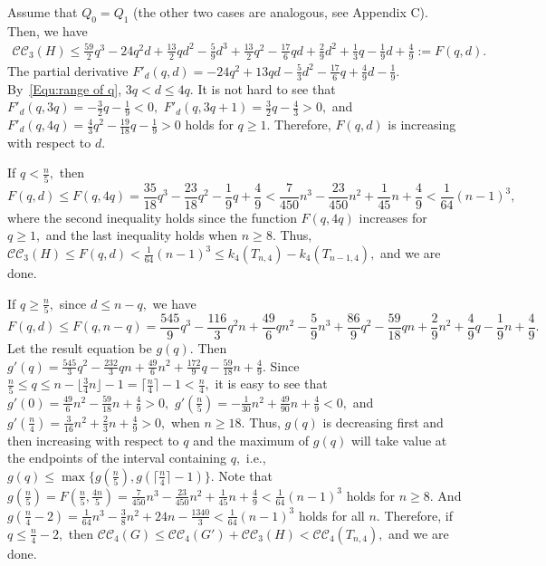 \documentclass[11pt,a4paper]{article}
\newcommand{\turangraph}[2]{T_{#1,#2}}
\newcommand{\coveropt}[2]{{\mathcal{C}\mathcal{C}_{#1}(#2)}}
\begin{document}
Assume that $Q_0=Q_1$ (the other two cases are analogous, see Appendix C).
Then, we have
\begin{align}\label{Equ:CC3(H)<F(q,d)}
    \coveropt{3}{H} \leq	
    \frac{59}{2}q^3 -24q^2d +\frac{13}{2}qd^2 -\frac{5}{9}d^3
    +\frac{13}{2}q^2-\frac{17}{6}qd+\frac{2}{9}d^2+\frac{1}{3}q-\frac{1}{9}d+\frac{4}{9}:=F(q,d). 
\end{align}
The partial derivative $F'_d(q,d)=-24q^2+13qd-\frac 5 3 d^2-\frac {17} 6 q + \frac 4 9 d - \frac 1 9.$
By~\eqref{Equ:range of q}, $3q<d\le 4q.$
It is not hard to see that
$F'_d(q,3q)=-\frac 3 2 q - \frac 1 9 <0,$
$F'_d(q,3q+1)=\frac{3}2 q-\frac{4}{3}>0,$ and
$F'_d(q,4q)=\frac 4 3 q^2-\frac {19}{18} q - \frac 1 9>0$
holds for $q\geq 1.$
Therefore, $F(q,d)$ is increasing with respect to $d.$ 

If %
$q<\frac n 5,$
then $$F(q,d)\le F(q,4q)=\frac{35}{18}q^3-\frac{23}{18}q^2-\frac{1}{9}q+\frac 4 9<
\frac{7}{450}n^3-\frac{23}{450}n^2+\frac{1}{45}n+\frac 4 9<\frac{1}{64}(n-1)^3,$$
where the second inequality holds since the function $F(q,4q)$ increases for $q\ge1,$
and the last inequality holds when $n\ge 8.$
Thus, $\coveropt{3}{H} \le F(q,d) < \frac{1}{64}(n-1)^3\le k_4(\turangraph{n}{4})-k_4(\turangraph{n-1}{4}),$ and we are done.

If %
$q\ge \frac n 5,$ since $d\le n-q,$ we have
\begin{equation}\label{Equ:g(q)}
    F(q,d)\le F(q,n-q)=\frac{545}{9}q^3-\frac{116}{3}q^2n+\frac{49}{6}qn^2-\frac{5}{9}n^3+\frac{86}{9}q^2-\frac{59}{18}qn+\frac{2}{9}n^2+\frac{4}{9}q-\frac{1}{9}n+\frac 4 9.
\end{equation}
Let the result equation be $g(q).$ 
Then $g'(q)=\frac{545}{3}q^2-\frac{232}{3}qn+\frac{49}{6}n^2+\frac{172}{9}q-\frac{59}{18}n+\frac{4}{9}.$
Since $\frac n 5\le q\le n-\lfloor\frac{3}{4}n\rfloor-1=\lceil\frac{n}{4}\rceil-1<\frac n 4,$
it is easy to see that 
$g'(0)=\frac{49}{6}n^2-\frac{59}{18}n+\frac{4}{9}>0,$
$g'(\frac n 5)=-\frac{1}{30}n^2+\frac{49}{90}n+\frac{4}{9}<0,$ and
$g'(\frac n 4)=\frac{3}{16}n^2+\frac{2}{3}n+\frac{4}{9}>0,$
when $n\ge 18.$
Thus, $g(q)$ is decreasing first and then increasing with respect to $q$
and the maximum of $g(q)$ will take value at the endpoints of the interval containing $q,$ i.e., 
$g(q)\le \max\{g(\frac n 5),g(\lceil\frac{n}{4}\rceil-1)\}.$
Note that 
$g(\frac n 5)=F(\frac n 5,\frac {4n} 5)=\frac{7}{450}n^3-\frac{23}{450}n^2+\frac{1}{45}n+\frac 4 9<\frac{1}{64}(n-1)^3$ holds for $n\ge 8.$
And 
$g(\frac{n}{4}-2)=\frac{1}{64}n^3-\frac{3}{8}n^2+24n-\frac{1340}{3}<\frac{1}{64}(n-1)^3$ holds for all $n.$
Therefore, if $q\le \frac n 4-2,$ 
then $\coveropt{4}{G}\le \coveropt{4}{G'}+\coveropt{3}{H}<\coveropt{4}{\turangraph{n}{4}},$ 
and we are done.
\end{document}
